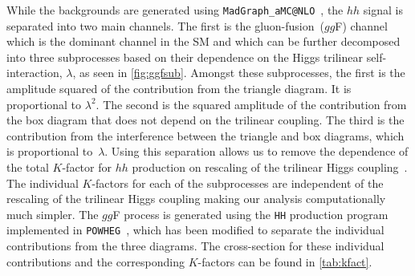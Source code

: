 While the backgrounds are generated using \texttt{MadGraph\_aMC@NLO}~\cite{Alwall:2014hca}, the $hh$ signal is separated into two main channels. The first is the gluon-fusion~($gg$F) channel which is the dominant channel in the SM and which can be further decomposed into three subprocesses based on their dependence on the Higgs trilinear self-interaction, $\lambda$, as seen in \autoref{fig:ggfsub}. Amongst these subprocesses, the first is the amplitude squared of the contribution from the triangle diagram. It is proportional to $\lambda^2$. The second is the squared amplitude of the contribution from the box diagram that does not depend on the trilinear coupling. The third is the contribution from the interference between the triangle and box diagrams, which is proportional to~$\lambda$. Using this separation allows us to remove the dependence of the total $K$-factor for $hh$ production on rescaling of the trilinear Higgs coupling~\cite{Heinrich:2019bkc}. The individual $K$-factors for each of the subprocesses are independent of the rescaling of the trilinear Higgs coupling making our analysis computationally much simpler. The $gg$F process is generated using the \texttt{HH} production program implemented in \texttt{POWHEG}~\cite{Heinrich:2017kxx,Heinrich:2019bkc,Heinrich:2020ckp}, which has been modified to separate the individual contributions from the three diagrams. The cross-section for these individual contributions and the corresponding $K$-factors can be found in \autoref{tab:kfact}. 

